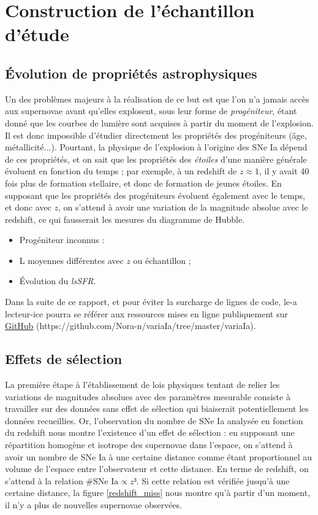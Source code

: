 \documentclass[a4paper, 12pt, svgnames]{article}
\begin{document}
\section{Construction de l'échantillon d'étude}\label{sec:complet}
\subsection{Évolution de propriétés astrophysiques}\label{ssec:prog}

Un des problèmes majeurs à la réalisation de ce but est que l'on n'a jamais
accès aux supernovae avant qu'elles explosent, sous leur forme de
\textit{progéniteur}, étant donné que les courbes de lumière sont acquises à
partir du moment de l'explosion. Il est donc impossible d'étudier directement
les propriétés des progéniteurs (âge, métallicité...). Pourtant, la physique de
l'explosion à l'origine des SNe Ia dépend de ces propriétés, et on sait que les
propriétés des \textit{étoiles} d'une manière générale évoluent en fonction du
temps ; par exemple, à un redshift de $z \approx 1$, il y avait 40 fois plus de
formation stellaire, et donc de formation de jeunes étoiles. En supposant que
les propriétés des progéniteurs évoluent également avec le temps, et donc avec
$z$, on s'attend à avoir une variation de la magnitude absolue avec le redshift,
ce qui fausserait les mesures du diagramme de Hubble.

\begin{itemize}
    \item Progéniteur inconnus :
    \item L moyennes différentes avec $z$ ou échantillon ;
    \item Évolution du \textit{lsSFR}.
\end{itemize}

Dans la suite de ce rapport, et pour éviter la surcharge de lignes de code, le-a
lecteur-ice pourra se référer aux ressources mises en ligne publiquement sur
\href{https://github.com/Nora-n/variaIa/tree/master/variaIa}{GitHub}
(https://github.com/Nora-n/variaIa/tree/master/variaIa).

\subsection{Effets de sélection}\label{ssec:selec}
La première étape à l'établissement de lois physiques tentant de relier les
variations de magnitudes absolues avec des paramètres mesurable consiste à
travailler sur des données sans effet de sélection qui biaiserait
potentiellement les données recueillies. Or, l'observation du nombre de SNe Ia
analysée en fonction du redshift nous montre l'existence d'un effet de sélection
: en supposant une répartition homogène et isotrope des supernovae dans
l'espace, on s'attend à avoir un nombre de SNe Ia à une certaine distance comme
étant proportionnel au volume de l'espace entre l'observateur et cette distance.
En terme de redshift, on s'attend à la relation $\#\text{SNe Ia} \propto z³$. Si
cette relation est vérifiée jusqu'à une certaine distance, la figure
\ref{redshift_miss} nous montre qu'à partir d'un moment, il n'y a plus de
nouvelles supernovae observées.
\end{document}
